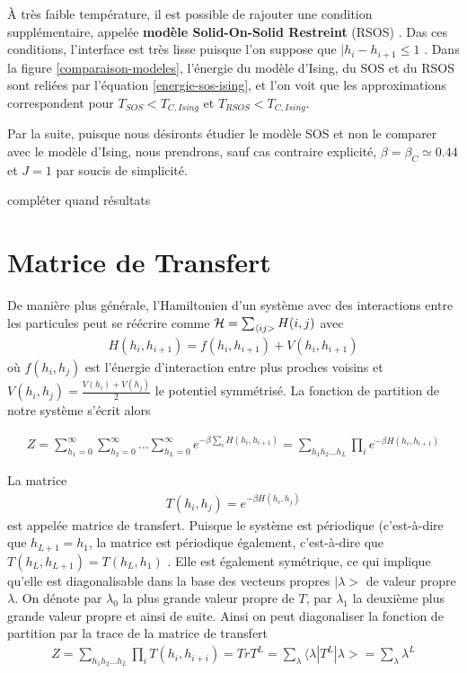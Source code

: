 À très faible température, il est possible de rajouter une condition supplémentaire, appelée \textbf{modèle Solid-On-Solid Restreint} (RSOS) \cite{privman_transfer-matrix_1989}. Das ces conditions, l'interface est très lisse puisque l'on suppose que $|h_i - h_{i+1} \leq 1$ \cite{kim_conserved_1994,vaysburd_critical_1995}. Dans la figure \ref{comparaison-modeles}, l'énergie du modèle d'Ising, du SOS et du RSOS sont reliées par l'équation \ref{energie-sos-ising}, et l'on voit que les approximations correspondent pour $T_{SOS} \less T_{C,Ising}$ et $T_{RSOS} \less T_{C,Ising}$. 


Par la suite, puisque nous désironts étudier le modèle SOS et non le comparer avec le modèle d'Ising, nous prendrons, sauf cas contraire explicité, $\beta = \beta_C \simeq 0.44$ et $J=1$ par soucis de simplicité. 

 {\color{red} compléter quand résultats}

  \section{Matrice de Transfert}

	De manière plus générale, l'Hamiltonien d'un système avec des interactions entre les particules peut se réécrire comme $\mathcal{H} = \sum_{\langle ij >} H(i,j)$ avec
\begin{align*}
  H(h_i,h_{i+1}) = f(h_i,h_{i+1}) + V(h_i,h_{i+1}) 
\end{align*}
où $f(h_i,h_j)$ est l'énergie d'interaction entre plus proches voisins et $V(h_i,h_j)=\frac{V(h_i)+V(h_j)}{2}$ le potentiel symmétrisé.
La fonction de partition de notre système s'écrit alors 

\begin{align*}
 Z = \sum_{h_1=0}^\infty \sum_{h_2=0}^\infty ... \sum_{h_L=0}^\infty e^{- \beta \sum_{i} H(h_i,h_{i+1})}  
   = \sum_{h_1 h_2 ... h_L} \prod_{i} e^{-\beta H(h_i,h_{i+1})} 
\end{align*}

La matrice 
\begin{align}
    T(h_i,h_j) = e^{-\beta H(h_i,h_j)}
    \label{matric-transfert}
\end{align}
est appelée matrice de transfert. Puisque le système est périodique (c'est-à-dire que $h_{L+1} = h_1$,  la matrice est périodique également, c'est-à-dire que $T(h_L,h_{L+1}) = T(h_L,h_1)$ \cite{pearce_exact_1989}. Elle est également symétrique, ce qui implique qu'elle est diagonalisable dans la base des vecteurs propres $|\lambda >$ de valeur propre $\lambda$. On dénote par $\lambda_0$ la plus grande valeur propre de $T$, par $\lambda_1$ la deuxième plus grande valeur propre et ainsi de suite.
Ainsi on peut diagonaliser la fonction de partition par la trace de la matrice de transfert \cite{abraham_transfer_1973}
\begin{align}
  Z = \sum_{h_1 h_2 ... h_L} \prod_{i} T(h_i,h_{i+i}) = Tr T^L  = \sum_\lambda \langle\lambda | T^L | \lambda> = \sum_\lambda \lambda^L
\end{align}


